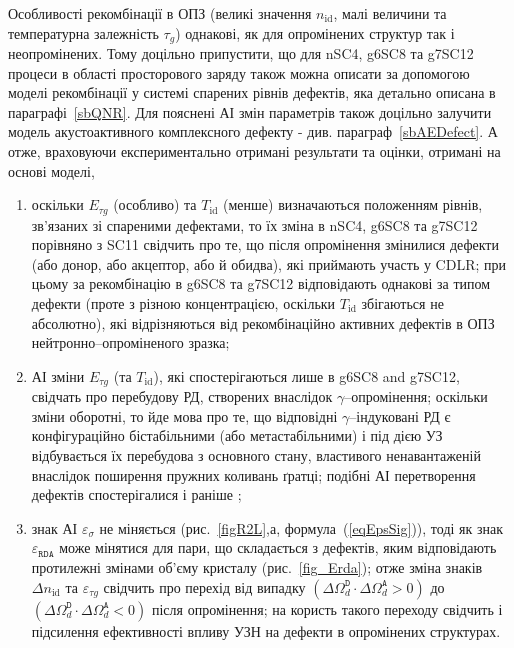 Особливості рекомбінації в ОПЗ (великі значення $n_\mathrm{id}$, малі величини та температурна залежність $\tau_g$)
однакові, як  для опромінених структур так і неопромінених.
Тому доцільно припустити, що для nSC4, g6SC8 та g7SC12 процеси в області просторового заряду також можна описати
за допомогою моделі рекомбінації у системі спарених рівнів дефектів, яка детально описана в параграфі~\ref{sbQNR}.
Для пояснені АІ змін параметрів також доцільно залучити модель акустоактивного комплексного дефекту - див. параграф~\ref{sbAEDefect}.
А отже, враховуючи експериментально отримані результати та оцінки, отримані на основі моделі,
\begin{enumerate}[label=\asbuk*),leftmargin=0em,itemindent=1.5em]
\item оскільки $E_{\tau g}$ (особливо) та $T_{\mathrm{id}}$ (менше) визначаються положенням рівнів, зв'язаних
зі спареними дефектами, то їх зміна в nSC4, g6SC8 та g7SC12 порівняно з SC11 свідчить про те, що
після опромінення змінилися дефекти (або донор, або акцептор, або й обидва), які приймають участь у CDLR;
при цьому за рекомбінацію в g6SC8 та g7SC12 відповідають однакові за типом дефекти (проте з різною концентрацією,
 оскільки $T_{\mathrm{id}}$ збігаються не абсолютно), які відрізняються від рекомбінаційно активних дефектів в ОПЗ нейтронно--опроміненого зразка;

\item  АІ зміни   $E_{\tau g}$ (та $T_{\mathrm{id}}$), які спостерігаються лише в g6SC8 and g7SC12,
 свідчать про перебудову РД, створених внаслідок $\gamma$--опромінення;
 оскільки зміни оборотні, то йде мова про те, що відповідні
 $\gamma$--індуковані РД є конфігураційно бістабільними (або метастабільними) і під дією УЗ відбувається їх перебудова з основного стану,
 властивого ненавантаженій внаслідок поширення пружних коливань ґратці;
 подібні АІ перетворення дефектів спостерігалися і раніше \cite{Wosinski,Ostapenko1994,YOlikhTPL2011r};

 \item знак АІ $\varepsilon_{\sigma}$ не міняється (рис.~\ref{figR2L},а, формула~(\ref{eqEpsSig})), тоді як
  знак  $\varepsilon_{\mathtt{RDA}}$  може мінятися для пари, що складається з дефектів, яким відповідають протилежні
  змінами об'єму кристалу (рис.~\ref{fig_Erda});
  отже зміна знаків $\Delta n_{\mathrm{id}}$ та $\varepsilon_{\tau g}$ свідчить про перехід від випадку
  $(\Delta\Omega_d^\mathtt{D}\cdot\Delta\Omega_d^\mathtt{A}>0)$ до
  $(\Delta\Omega_d^\mathtt{D}\cdot\Delta\Omega_d^\mathtt{A}<0)$ після опромінення;
  на користь такого переходу свідчить і підсилення ефективності впливу УЗН на дефекти в опромінених структурах.
\end{enumerate}

